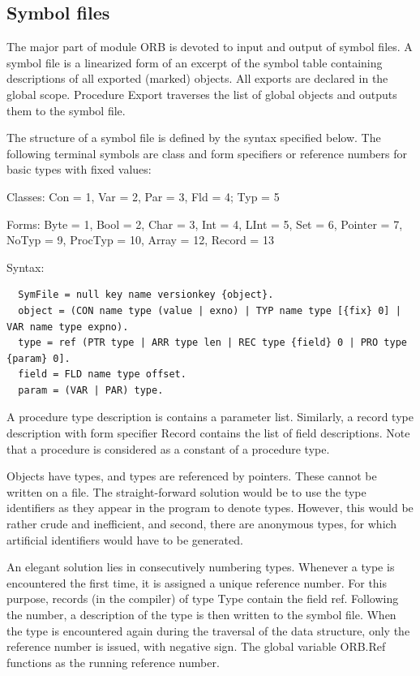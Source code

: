 \subsection{Symbol files}
The major part of module ORB is devoted to input and output of symbol files. A symbol file is a
linearized form of an excerpt of the symbol table containing descriptions of all exported (marked)
objects. All exports are declared in the global scope. Procedure Export traverses the list of global
objects and outputs them to the symbol file.

The structure of a symbol file is defined by the syntax specified below. The following terminal
symbols are class and form specifiers or reference numbers for basic types with fixed values:

Classes: Con = 1, Var = 2, Par = 3, Fld = 4; Typ = 5

Forms: Byte = 1, Bool = 2, Char = 3, Int = 4, LInt = 5, Set = 6,
       Pointer = 7, NoTyp = 9, ProcTyp = 10, Array = 12, Record = 13

Syntax:
\begin{verbatim}
  SymFile = null key name versionkey {object}.
  object = (CON name type (value | exno) | TYP name type [{fix} 0] | VAR name type expno).
  type = ref (PTR type | ARR type len | REC type {field} 0 | PRO type {param} 0].
  field = FLD name type offset.
  param = (VAR | PAR) type.
\end{verbatim}

A procedure type description is contains a parameter list. Similarly, a record type description with
form specifier Record contains the list of field descriptions. Note that a procedure is considered as a
constant of a procedure type.

Objects have types, and types are referenced by pointers. These cannot be written on a file. The
straight-forward solution would be to use the type identifiers as they appear in the program to
denote types. However, this would be rather crude and inefficient, and second, there are
anonymous types, for which artificial identifiers would have to be generated.

An elegant solution lies in consecutively numbering types. Whenever a type is encountered the first
time, it is assigned a unique reference number. For this purpose, records (in the compiler) of type
Type contain the field ref. Following the number, a description of the type is then written to the
symbol file. When the type is encountered again during the traversal of the data structure, only the
reference number is issued, with negative sign. The global variable ORB.Ref functions as the
running reference number.

